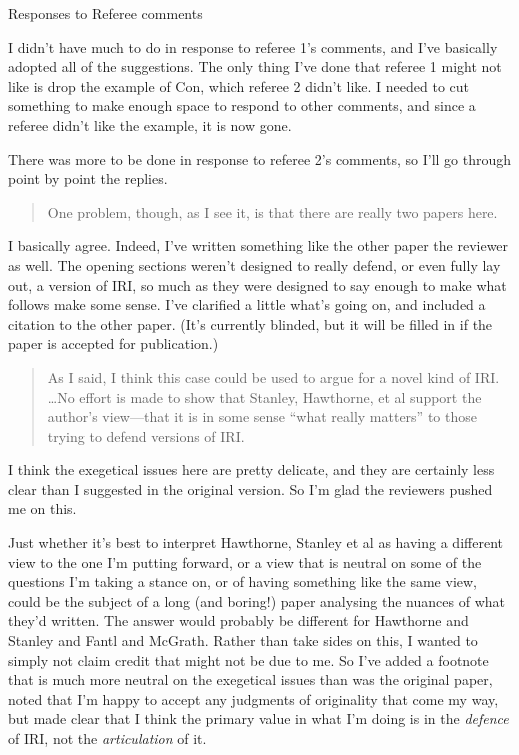 \documentclass[]{article}
\newcommand{\reviewer}[1]{
\begin{quote}
#1
\end{quote}
\noindent}
\begin{document}
\pagestyle{empty}

\begin{center}
{\Large Responses to Referee comments}
\end{center}

\noindent I didn't have much to do in response to referee 1's comments, and I've basically adopted all of the suggestions. The only thing I've done that referee 1 might not like is drop the example of Con, which referee 2 didn't like. I needed to cut something to make enough space to respond to other comments, and since a referee didn't like the example, it is now gone.

There was more to be done in response to referee 2's comments, so I'll go through point by point the replies.

\reviewer{One problem, though, as I see it, is that there are really two papers here.}%
I basically agree. Indeed, I've written something like the other paper the reviewer as well. The opening sections weren't designed to really defend, or even fully lay out, a version of IRI, so much as they were designed to say enough to make what follows make some sense. I've clarified a little what's going on, and included a citation to the other paper. (It's currently blinded, but it will be filled in if the paper is accepted for publication.)

\reviewer{As I said, I think this case could be used to argue for a novel kind of IRI.  \dots No effort is made to show that Stanley, Hawthorne, et al support the author's view---that it is in some sense ``what really matters'' to those trying to defend versions of IRI.}%
I think the exegetical issues here are pretty delicate, and they are certainly less clear than I suggested in the original version. So I'm glad the reviewers pushed me on this. 

Just whether it's best to interpret Hawthorne, Stanley et al as having a different view to the one I'm putting forward, or a view that is neutral on some of the questions I'm taking a stance on, or of having something like the same view, could be the subject of a long (and boring!) paper analysing the nuances of what they'd written. The answer would probably be different for Hawthorne and Stanley and Fantl and McGrath. Rather than take sides on this, I wanted to simply not claim credit that might not be due to me. So I've added a footnote that is much more neutral on the exegetical issues than was the original paper, noted that I'm happy to accept any judgments of originality that come my way, but made clear that I think the primary value in what I'm doing is in the \textit{defence} of IRI, not the \textit{articulation} of it.
\end{document}
